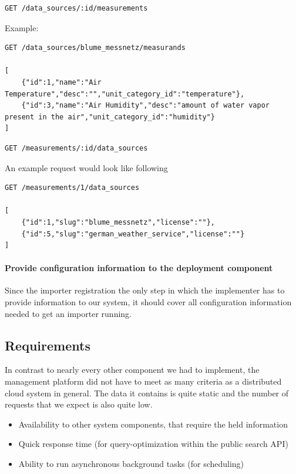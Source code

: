 \begin{verbatim}
GET /data_sources/:id/measurements
\end{verbatim}

Example:

\begin{verbatim}
GET /data_sources/blume_messnetz/measurands

[
    {"id":1,"name":"Air Temperature","desc":"","unit_category_id":"temperature"},
    {"id":3,"name":"Air Humidity","desc":"amount of water vapor present in the air","unit_category_id":"humidity"}
]
\end{verbatim}

\begin{verbatim}
GET /measurements/:id/data_sources
\end{verbatim}

An example request would look like following

\begin{verbatim}
GET /measurements/1/data_sources

[
    {"id":1,"slug":"blume_messnetz","license":""},
    {"id":5,"slug":"german_weather_service","license":""}
]
\end{verbatim}

\paragraph{Provide configuration information to the deployment
component}\label{provide-configuration-information-to-the-deployment-component}

Since the importer registration the only step in which the implementer
has to provide information to our system, it should cover all
configuration information needed to get an importer running.

\subsection{Requirements}\label{requirements}

In contrast to nearly every other component we had to implement, the
management platform did not have to meet as many criteria as a
distributed cloud system in general. The data it contains is quite
static and the number of requests that we expect is also quite low.

\begin{itemize}
\tightlist
\item
  Availability to other system components, that require the held
  information
\item
  Quick response time (for query-optimization within the public search
  API)
\item
  Ability to run asynchronous background tasks (for scheduling)
\end{itemize}

